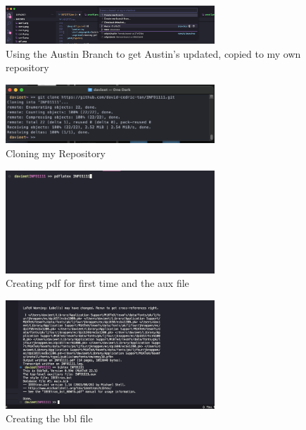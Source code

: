 \documentclass[a4paper, 11pt]{report}
\begin{document}
\begin{figure}[H]
    \centering
    \includegraphics[width=0.7\textwidth]{Austinbranch}
    \caption{Using the Austin Branch to get Austin's updated, copied to my own repository}
\end{figure}

\begin{figure}[H]
    \centering
    \includegraphics[width=0.7\textwidth]{selfrepo}
    \caption{Cloning my Repository}
\end{figure}


\begin{figure}[H]
    \centering
    \includegraphics[width=0.7\textwidth]{proof2}
    \caption{Creating pdf for first time and the aux file}
\end{figure}

\begin{figure}[H]
    \centering
    \includegraphics[width=0.7\textwidth]{proof3}
    \caption{Creating the bbl file}
\end{figure}
\end{document}
